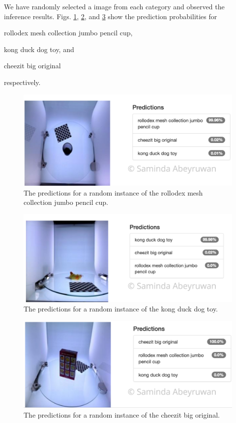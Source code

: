 \documentclass[10pt,journal,compsoc]{IEEEtran}
\begin{document}
We have randomly selected a image from each category and observed the inference results. Figs. \ref{fig:R2}, \ref{fig:R1}, and \ref{fig:R3} show the prediction probabilities for  \begin{enumerate*}
\item rollodex mesh collection jumbo pencil cup, \item kong duck dog toy, and \item cheezit big original
\end{enumerate*} respectively. 

\begin{figure}[thpb]
      \centering
      \includegraphics[width=\linewidth]{R2}
      \caption{The predictions for a random instance of the rollodex mesh collection jumbo pencil cup.}
      \label{fig:R2}
\end{figure}

\begin{figure}[thpb]
      \centering
      \includegraphics[width=\linewidth]{R1}
      \caption{The predictions for a random instance of the kong duck dog toy.}
      \label{fig:R1}
\end{figure}

\begin{figure}[thpb]
      \centering
      \includegraphics[width=\linewidth]{R3}
      \caption{The predictions for a random instance of the cheezit big original.}
      \label{fig:R3}
\end{figure}
\end{document}
